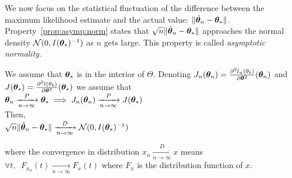 We now focus on the statistical fluctuation of the difference between the
maximum likelihood estimate and the actual value: $\|\hat{\thetab}_n -
\thetab_*\|$. Property~\ref{prop:asymp:norm} states that
$\sqrt{n}\|\hat{\thetab}_n - \thetab_*\|$ approaches the normal density
$\Ncal(0, I(\thetab_*)^{-1})$ as $n$ gets large. This property is called \emph{asymptotic normality}.

\begin{prop}
  \label{prop:asymp:norm}
  We assume that $\thetab_*$ is in the interior of $\Theta$.
  Denoting $J_n(\thetab_n) =
  \partialfrac{\thetab^2}{^2l_n(\theta_b)}(\thetab_n)$ and $J(\thetab_*) =
  \partialfrac{\thetab^2}{^2l(\theta_b)}(\thetab_*)$ we assume that \\
  $\thetab_n \xrightarrow[n \rightarrow
  \infty]{P} \thetab_* \implies J_n(\thetab_n) \xrightarrow[n \rightarrow
  \infty]{P} J(\thetab_*)$\\
  Then, \\
  $\sqrt{n} \| \hat{\thetab}_n - \thetab_* \| \xrightarrow[n \rightarrow
  \infty]{D}  \Ncal(0,
  I(\thetab_*)^{-1})$
\end{prop}
where the convergence in distribution $ x_n \xrightarrow[n \rightarrow \infty]{D} x$ means  $\forall t, \enspace F_{x_n}(t)
\xrightarrow[n \rightarrow \infty]{} F_x(t)$ where $F_x$ is the distribution
function of $x$.
